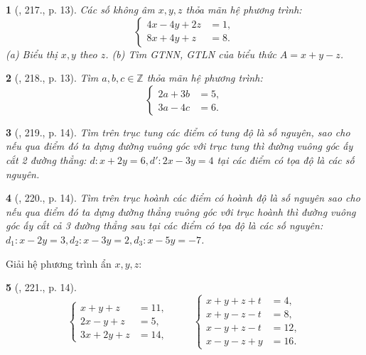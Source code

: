 \documentclass{article}
\newtheorem{baitoan}{}
\begin{document}
\begin{baitoan}[\cite{Binh_Toan_9_tap_2}, 217., p. 13]
	Các số không âm $x,y,z$ thỏa mãn hệ phương trình:
	\begin{equation*}
		\left\{\begin{split}
			4x - 4y + 2z &= 1,\\
			8x + 4y + z &= 8.
		\end{split}\right.
	\end{equation*}
	(a) Biểu thị $x,y$ theo $z$. (b) Tìm {\rm GTNN, GTLN} của biểu thức $A = x + y - z$.
\end{baitoan}

\begin{baitoan}[\cite{Binh_Toan_9_tap_2}, 218., p. 13]
	Tìm $a,b,c\in\mathbb{Z}$ thỏa mãn hệ phương trình:
	\begin{equation*}
		\left\{\begin{split}
			2a + 3b &= 5,\\
			3a - 4c &= 6.
		\end{split}\right.
	\end{equation*}
\end{baitoan}

\begin{baitoan}[\cite{Binh_Toan_9_tap_2}, 219., p. 14]
	Tìm trên trục tung các điểm có tung độ là số nguyên, sao cho nếu qua điểm đó ta dựng đường vuông góc với trục tung thì đường vuông góc ấy cắt 2 đường thẳng: $d:x + 2y = 6,d':2x - 3y = 4$ tại các điểm có tọa độ là các số nguyên.
\end{baitoan}

\begin{baitoan}[\cite{Binh_Toan_9_tap_2}, 220., p. 14]
	Tìm trên trục hoành các điểm có hoành độ là số nguyên sao cho nếu qua điểm đó ta dựng đường thẳng vuông góc với trục hoành thì đường vuông góc ấy cắt cả 3 đường thẳng sau tại các điểm có tọa độ là các số nguyên: $d_1:x - 2y = 3,d_2:x - 3y = 2,d_3:x - 5y = -7$.
\end{baitoan}
Giải hệ phương trình ẩn $x,y,z$:

\begin{baitoan}[\cite{Binh_Toan_9_tap_2}, 221., p. 14]
	\begin{equation*}
		\left\{\begin{split}
			x + y + z &= 11,\\
			2x - y + z &= 5,\\
			3x + 2y + z &= 14,
		\end{split}\right.\hspace{1cm}\left\{\begin{split}
			x + y + z + t &= 4,\\
			x + y - z - t &= 8,\\
			x - y + z - t &= 12,\\
			x - y - z + y &= 16.
		\end{split}\right.
	\end{equation*}
\end{baitoan}
\end{document}
